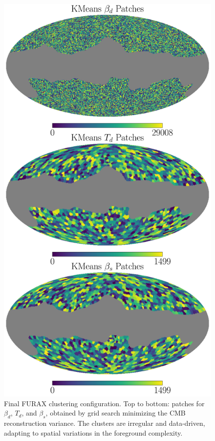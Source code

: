 \documentclass[fleqn,usenatbib]{mnras}
\begin{document}
\begin{figure}
    \centering
    \includegraphics[width=\linewidth]{figures/kmeans_patch_layout.pdf}
    \caption{
    Final FURAX clustering configuration. 
    Top to bottom: patches for \( \beta_d \), \( T_d \), and \( \beta_s \), obtained by grid search minimizing the CMB reconstruction variance.
    The clusters are irregular and data-driven, adapting to spatial variations in the foreground complexity.
    }
    \label{fig:furax_patches}
\end{figure}
\end{document}
